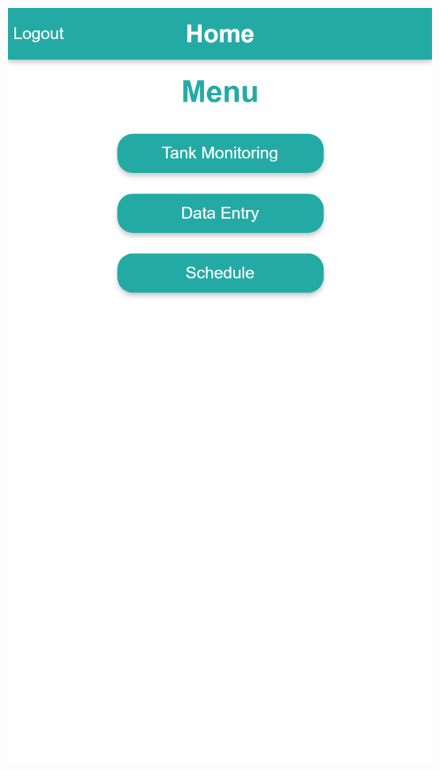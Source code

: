 \begin{figure}[H]
\begin{multicols}{3}
            \includegraphics[width=\linewidth]{./img/mobile-home-page.png}

\end{multicols}
\end{figure}
